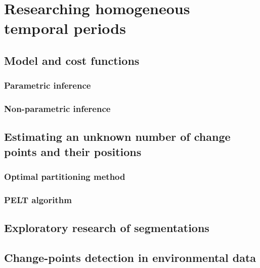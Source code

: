\chapter{Researching homogeneous temporal periods}\label{chp:3}

\minitoc

\clearpage

\section{Model and cost functions}

\subsection{Parametric inference}

\subsection{Non-parametric inference}

\section{Estimating an unknown number of change points and their positions}

\subsection{Optimal partitioning method}

\subsection{PELT algorithm}

\section{Exploratory research of segmentations}

\section{Change-points detection in environmental data}
